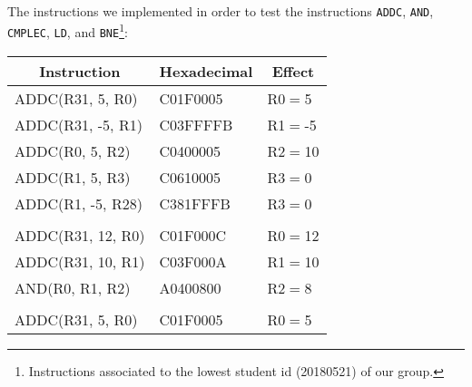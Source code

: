 \documentclass[a4paper, 10pt, oneside]{article}
\begin{document}
\paragraph{}The instructions we implemented in order to test the instructions \texttt{ADDC}, \texttt{AND}, \texttt{CMPLEC}, \texttt{LD}, and \texttt{BNE}\footnote{Instructions associated to the lowest student id (20180521) of our group.}:
\begin{table}[!ht]
\centering
\begin{tabular}{|l|l|l|}
\hline
\multicolumn{1}{|c|}{\textbf{Instruction}} & \multicolumn{1}{c|}{\textbf{Hexadecimal}} & \multicolumn{1}{c|}{\textbf{Effect}}  \\ \hline
ADDC(R31, 5, R0)                           & C01F0005                                  & R0$=$5                               \\ \hline
ADDC(R31, -5, R1)                          & C03FFFFB                                  & R1$=$-5                              \\ \hline
ADDC(R0, 5, R2)                            & C0400005                                  & R2$=$10                              \\ \hline
ADDC(R1, 5, R3)                            & C0610005                                  & R3$=$0                              \\ \hline
ADDC(R1, -5, R28)                          & C381FFFB                                  & R3$=$0                               \\ \hline
                                           &                                           &                                       \\ \hline
ADDC(R31, 12, R0)                          & C01F000C                                  & R0$=$12                              \\ \hline
ADDC(R31, 10, R1)                          & C03F000A                                  & R1$=$10                              \\ \hline
AND(R0, R1, R2)                            & A0400800                                  & R2$=$8                               \\ \hline
                                           &                                           &                                       \\ \hline
ADDC(R31, 5, R0)                           & C01F0005                                  & R0$=$5                             \\ \hline

\end{tabular}
\end{table}
\end{document}

